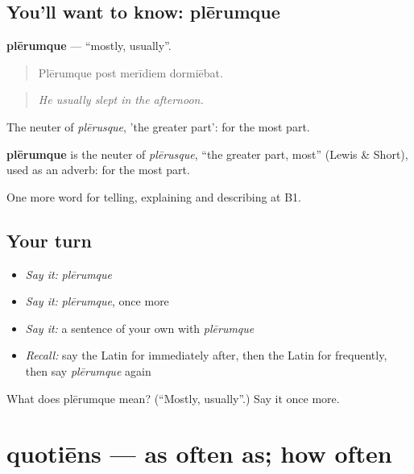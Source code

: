 \subsection*{You'll want to know: plērumque}
\textbf{plērumque} — \textquotedblleft{}mostly, usually\textquotedblright{}.

\begin{quote}
Plērumque post merīdiem dormiēbat.
\end{quote}

\begin{quote}
\emph{He usually slept in the afternoon.}
\end{quote}

The neuter of \emph{plērusque}, 'the greater part': for the most part.

\begin{cousinweb}
\textbf{plērumque} is the neuter of \emph{plērusque}, \textquotedblleft{}the greater part, most\textquotedblright{} (Lewis \& Short), used as an adverb: for the most part.
\end{cousinweb}

\begin{grammarlens}[title={What you've built}]
One more word for telling, explaining and describing at B1.
\end{grammarlens}

\subsection*{Your turn}
\begin{itemize}
\raggedright
  \item \emph{Say it:} \emph{plērumque}
  \item \emph{Say it:} \emph{plērumque}, once more
  \item \emph{Say it:} a sentence of your own with \emph{plērumque}
  \item \emph{Recall:} say the Latin for immediately after, then the Latin for frequently, then say \emph{plērumque} again
\end{itemize}

\begin{tcolorbox}[breakable,colback=teal!4,colframe=teal!35!black,title={Before you move on}]
What does plērumque mean? (\textquotedblleft{}Mostly, usually\textquotedblright{}.) Say it once more.
\end{tcolorbox}
\section[quotiēns]{quotiēns — as often as; how often}

